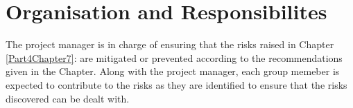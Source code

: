 
\chapter{Organisation and Responsibilites} %

\label{Part4Chapter4} %


The project manager is in charge of ensuring that the risks raised in Chapter \ref{Part4Chapter7}: are mitigated or prevented according to the recommendations given in the Chapter. Along with the project manager, each group memeber is expected to contribute to the risks as they are identified to ensure that the risks discovered can be dealt with.